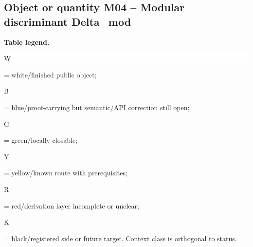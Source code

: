 \subsection*{Object or quantity M04 -- Modular discriminant Delta\_mod}
\hypertarget{objproof:M04}{}
\par\smallskip\noindent\begin{minipage}{0.99\linewidth}\footnotesize\raggedright\textbf{Table legend.} \colorbox{white}{\strut W} = white/finished public object; \colorbox{cyan!20}{\strut B} = blue/proof-carrying but semantic/API correction still open; \colorbox{green!18}{\strut G} = green/locally closable; \colorbox{yellow!25}{\strut Y} = yellow/known route with prerequisites; \colorbox{red!20}{\strut R} = red/derivation layer incomplete or unclear; \colorbox{black!18}{\strut K} = black/registered side or future target. Context class is orthogonal to status.\end{minipage}\par\vspace{0.25em}
